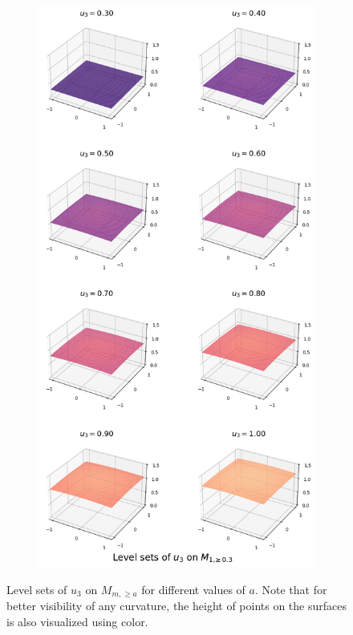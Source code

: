 \documentclass[titlepage,numbers=noenddot,oneside,%
cleardoublepage=empty,paper=a4,fontsize=11pt,%
english,%
]{scrartcl}
\begin{document}
\begin{figure}
\begin{subfigure}{.49\textwidth}
    \end{subfigure}
    \begin{subfigure}{.49\textwidth}
        \includegraphics[width=\textwidth]{figures/level_sets_u3_modified_with_a_0.3.png}
    \end{subfigure}
    \caption{Level sets of \( u_3 \) on \( M_{m,\geq a} \) for different values of \( a \). Note that for better visibility of any curvature, the height of points on the surfaces is also visualized using color.}
    \label{fig:level_sets_modified}
\end{figure}
\end{document}

